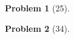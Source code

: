 \documentclass{article}
\theoremstyle{problem}
\newtheorem{prob}{Problem}
\theoremstyle{plain}
\theoremstyle{remark}
\begin{document}
\begin{prob}[25]

\end{prob}
%

\begin{prob}[34]

\end{prob}
%
\end{document}
